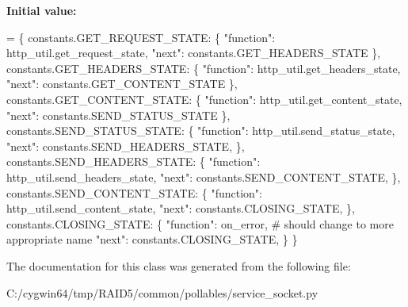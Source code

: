 {\bfseries Initial value\+:}
\begin{DoxyCode}
=  \{
        constants.GET\_REQUEST\_STATE: \{
            \textcolor{stringliteral}{"function"}: http\_util.get\_request\_state,
            \textcolor{stringliteral}{"next"}: constants.GET\_HEADERS\_STATE
        \},
        constants.GET\_HEADERS\_STATE: \{
            \textcolor{stringliteral}{"function"}: http\_util.get\_headers\_state,
            \textcolor{stringliteral}{"next"}: constants.GET\_CONTENT\_STATE
        \},
        constants.GET\_CONTENT\_STATE: \{
            \textcolor{stringliteral}{"function"}: http\_util.get\_content\_state,
            \textcolor{stringliteral}{"next"}: constants.SEND\_STATUS\_STATE
        \},
        constants.SEND\_STATUS\_STATE: \{
            \textcolor{stringliteral}{"function"}: http\_util.send\_status\_state,
            \textcolor{stringliteral}{"next"}: constants.SEND\_HEADERS\_STATE,
        \},
        constants.SEND\_HEADERS\_STATE: \{
            \textcolor{stringliteral}{"function"}: http\_util.send\_headers\_state,
            \textcolor{stringliteral}{"next"}: constants.SEND\_CONTENT\_STATE,
        \},
        constants.SEND\_CONTENT\_STATE: \{
            \textcolor{stringliteral}{"function"}: http\_util.send\_content\_state,
            \textcolor{stringliteral}{"next"}: constants.CLOSING\_STATE,
        \},
        constants.CLOSING\_STATE: \{
            \textcolor{stringliteral}{"function"}: on\_error,  \textcolor{comment}{# should change to more appropriate name}
            \textcolor{stringliteral}{"next"}: constants.CLOSING\_STATE,
        \}
    \}
\end{DoxyCode}


The documentation for this class was generated from the following file\+:\begin{DoxyCompactItemize}
\item 
C\+:/cygwin64/tmp/\+R\+A\+I\+D5/common/pollables/service\+\_\+socket.\+py\end{DoxyCompactItemize}
